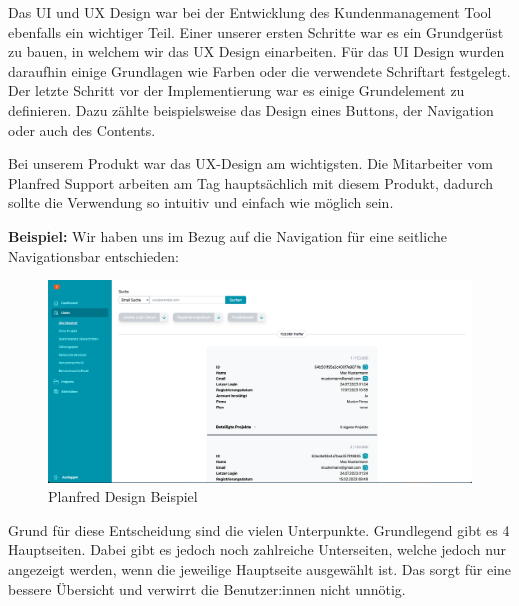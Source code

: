 Das UI und UX Design war bei der Entwicklung des Kundenmanagement Tool ebenfalls ein wichtiger Teil. Einer unserer ersten Schritte war es ein Grundgerüst zu bauen, in welchem wir das UX Design einarbeiten. Für das UI Design wurden daraufhin einige Grundlagen wie Farben oder die verwendete Schriftart festgelegt. Der letzte Schritt vor der Implementierung war es einige Grundelement zu definieren. Dazu zählte beispielsweise das Design eines Buttons, der Navigation oder auch des Contents.

Bei unserem Produkt war das UX-Design am wichtigsten. Die Mitarbeiter vom Planfred Support arbeiten am Tag hauptsächlich mit diesem Produkt, dadurch sollte die Verwendung so intuitiv und einfach wie möglich sein.

\textbf{Beispiel:}
\newline
Wir haben uns im Bezug auf die Navigation für eine seitliche Navigationsbar entschieden:

\begin{figure}[h!]
    \centering
    \includegraphics[width=1\textwidth]{pics/planfred-ui-ux-example.png}
    \caption{Planfred Design Beispiel}
    \label{fig:mesh1}
\end{figure}

Grund für diese Entscheidung sind die vielen Unterpunkte. Grundlegend gibt es 4 Hauptseiten. Dabei gibt es jedoch noch zahlreiche Unterseiten, welche jedoch nur angezeigt werden, wenn die jeweilige Hauptseite ausgewählt ist. Das sorgt für eine bessere Übersicht und verwirrt die Benutzer:innen nicht unnötig. 